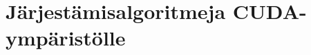 \documentclass[a4paper,11pt]{article}
\begin{document}

\section{Järjestämisalgoritmeja CUDA-ympäristölle}


\printbibliography
\end{document}
